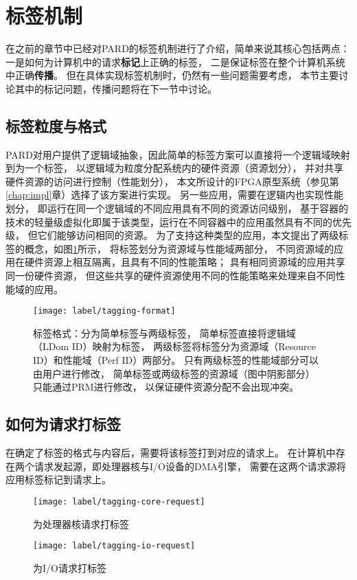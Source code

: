 \section{标签机制}

在之前的章节中已经对PARD的标签机制进行了介绍，简单来说其核心包括两点：
一是如何为计算机中的请求\textbf{标记}上正确的标签，
二是保证标签在整个计算机系统中正确\textbf{传播}。
但在具体实现标签机制时，仍然有一些问题需要考虑，
本节主要讨论其中的标记问题，传播问题将在下一节中讨论。


\subsection{标签粒度与格式}

PARD对用户提供了逻辑域抽象，因此简单的标签方案可以直接将一个逻辑域映射到为一个标签，
以逻辑域为粒度分配系统内的硬件资源（资源划分），
并对共享硬件资源的访问进行控制（性能划分），
本文所设计的FPGA原型系统（参见第\ref{chap:impl}章）选择了该方案进行实现。
另一些应用，需要在逻辑内也实现性能划分，
即运行在同一个逻辑域的不同应用具有不同的资源访问级别，
基于容器的技术的轻量级虚拟化即属于该类型，运行在不同容器中的应用虽然具有不同的优先级，
但它们能够访问相同的资源。
为了支持这种类型的应用，本文提出了两级标签的概念，如图\ref{fig:tagging-format}所示，
将标签划分为资源域与性能域两部分，
不同资源域的应用在硬件资源上相互隔离，且具有不同的性能策略；
具有相同资源域的应用共享同一份硬件资源，
但这些共享的硬件资源使用不同的性能策略来处理来自不同性能域的应用。

\begin{figure}[tb]
  \centering
  \texttt{[image: label/tagging-format]}
  \caption[标签格式]{标签格式：分为简单标签与两级标签，
    简单标签直接将逻辑域（LDom ID）映射为标签，
    两级标签将标签分为资源域（Resource ID）和性能域（Perf ID）两部分。
    只有两级标签的性能域部分可以由用户进行修改，
    简单标签或两级标签的资源域（图中阴影部分）只能通过PRM进行修改，
    以保证硬件资源分配不会出现冲突。}
  \label{fig:tagging-format}
\end{figure}

\subsection{如何为请求打标签}
在确定了标签的格式与内容后，需要将该标签打到对应的请求上。
在计算机中存在两个请求发起源，即处理器核与I/O设备的DMA引擎，
需要在这两个请求源将应用标签标记到请求上。

\begin{figure}[b]
\begin{minipage}{0.48\textwidth}
  \centering
  \texttt{[image: label/tagging-core-request]}
  \caption{为处理器核请求打标签}
  \label{fig:tagging-core-request}
\end{minipage}\hfill
\begin{minipage}{0.48\textwidth}
  \centering
  \texttt{[image: label/tagging-io-request]}
  \caption{为I/O请求打标签}
  \label{fig:tagging-io-request}
\end{minipage}
\end{figure}

